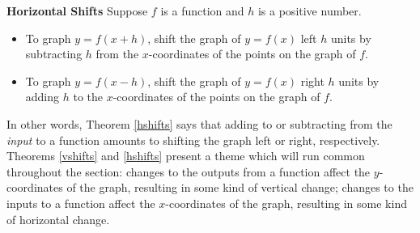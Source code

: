 \smallskip

\bbm


\begin{thm} \label{hshifts}\textbf{Horizontal Shifts}  Suppose $f$ is a function and $h$ is a positive number. 

\begin{itemize}

\item To graph $y=f(x+h)$, shift the graph of $y=f(x)$ left $h$ units by subtracting $h$ from the $x$-coordinates of the points on the graph of $f$.

\item To graph $y=f(x-h)$, shift the graph of $y=f(x)$ right $h$ units by adding $h$ to the $x$-coordinates of the points on the graph of $f$.

\end{itemize}

\end{thm}

\ebm

\smallskip

In other words,  Theorem \ref{hshifts} says that adding to or subtracting from the  \textit{input} to a function amounts to shifting the graph left or right, respectively.  Theorems \ref{vshifts} and \ref{hshifts} present a theme which will run common throughout the section:  changes to the outputs from a function affect the $y$-coordinates of the graph, resulting in some kind of vertical change;  changes to the inputs to a function affect the $x$-coordinates of the graph, resulting in some kind of horizontal change.


